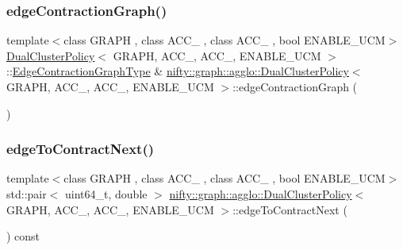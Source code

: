 \subsubsection{\texorpdfstring{edge\+Contraction\+Graph()}{edgeContractionGraph()}}
{\footnotesize\ttfamily template$<$class G\+R\+A\+PH , class A\+C\+C\+\_ , class A\+C\+C\+\_ , bool E\+N\+A\+B\+L\+E\+\_\+\+U\+CM$>$ \\
\hyperlink{classnifty_1_1graph_1_1agglo_1_1DualClusterPolicy}{Dual\+Cluster\+Policy}$<$ G\+R\+A\+PH, A\+C\+C\+\_, A\+C\+C\+\_, E\+N\+A\+B\+L\+E\+\_\+\+U\+CM $>$\+::\hyperlink{classnifty_1_1graph_1_1agglo_1_1DualClusterPolicy_a50412f31fd3dc355ef0804cb8d753c05}{Edge\+Contraction\+Graph\+Type} \& \hyperlink{classnifty_1_1graph_1_1agglo_1_1DualClusterPolicy}{nifty\+::graph\+::agglo\+::\+Dual\+Cluster\+Policy}$<$ G\+R\+A\+PH, A\+C\+C\+\_, A\+C\+C\+\_, E\+N\+A\+B\+L\+E\+\_\+\+U\+CM $>$\+::edge\+Contraction\+Graph (\begin{DoxyParamCaption}{ }\end{DoxyParamCaption})\hspace{0.3cm}{\ttfamily [inline]}}

\mbox{\label{classnifty_1_1graph_1_1agglo_1_1DualClusterPolicy_a71302b486964ff3d8f4c1b73cfbd7eae}} 
\subsubsection{\texorpdfstring{edge\+To\+Contract\+Next()}{edgeToContractNext()}}
{\footnotesize\ttfamily template$<$class G\+R\+A\+PH , class A\+C\+C\+\_ , class A\+C\+C\+\_ , bool E\+N\+A\+B\+L\+E\+\_\+\+U\+CM$>$ \\
std\+::pair$<$ uint64\+\_\+t, double $>$ \hyperlink{classnifty_1_1graph_1_1agglo_1_1DualClusterPolicy}{nifty\+::graph\+::agglo\+::\+Dual\+Cluster\+Policy}$<$ G\+R\+A\+PH, A\+C\+C\+\_, A\+C\+C\+\_, E\+N\+A\+B\+L\+E\+\_\+\+U\+CM $>$\+::edge\+To\+Contract\+Next (\begin{DoxyParamCaption}{ }\end{DoxyParamCaption}) const\hspace{0.3cm}{\ttfamily [inline]}}

